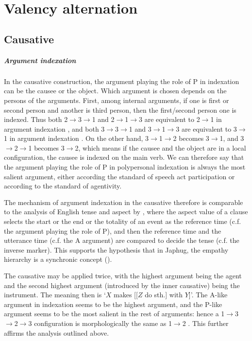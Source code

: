\documentclass[a4paper, oneside, 12pt]{report}
\newcommand*{\textto}{$\to$}
\newcommand*{\citesec}[1]{\S~{#1}}
\newcommand*{\citepage}[1]{p.~{#1}}
\newcommand{\translate}[1]{`#1'}
\begin{document}
\chapter{Valency alternation}

\section{Causative}

\paragraph*{Argument indexation}\label{sec:voice.causative.indexation}
In the causative construction, the argument playing the role of P in indexation
can be the causee or the object.
Which argument is chosen depends on the persons of the arguments.
First, among internal arguments,
if one is first or second person and another is third person,
then the first/second person one is indexed.
Thus both 2\textto 3\textto 1 and 2\textto 1\textto 3 
are equivalent to 2\textto 1 in argument indexation
\citep[\citepage{584}]{jacques2021grammar},
and both 3\textto 3\textto 1 and 3\textto 1\textto 3 
are equivalent to 3\textto 1 in argument indexation
\citep[\citepage{310}]{jacques2021grammar}.
On the other hand, 3\textto 1\textto 2 becomes 3\textto 1,
and 3\textto 2\textto 1 becomes 3\textto 2,
which means if the causee and the object are in a local configuration,
the causee is indexed on the main verb.
We can therefore say that the argument playing the role of P in polypersonal indexation
is always the most salient argument,
either according the standard of speech act participation or according to the standard of agentivity.

The mechanism of argument indexation in the causative
therefore is comparable to the analysis of English tense and aspect 
by \citet[\citesec{7.4.1}]{wiltschko2014universal},
where the aspect value of a clause selects the start or the end or the totality of an event
as the reference time (c.f. the argument playing the role of P),
and then the reference time and the utterance time (c.f. the A argument)
are compared to decide the tense (c.f. the inverse marker).
This supports the hypothesis that in Japhug,
the empathy hierarchy is a synchronic concept
().

The causative may be applied twice,
with the highest argument being the agent
and the second highest argument (introduced by the inner causative) being the instrument.
The meaning then is \translate{$X$ makes [[$Z$ do sth.] with $Y$]}.
The A-like argument in indexation seems to be the highest argument,
and the P-like argument seems to be the most salient in the rest of arguments:
hence a 1\textto 3\textto 2\textto 3 configuration
is morphologically the same as 1\textto 2
\citep[\citepage{848}, (67)]{jacques2021grammar}.
This further affirms the analysis outlined above.
\end{document}
